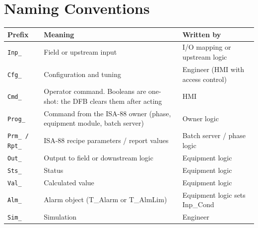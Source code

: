 \section{Naming Conventions}
\label{app:pclib:conv}
\begin{longtable}{@{}>{\raggedright\arraybackslash}p{2.4cm}>{\raggedright\arraybackslash}p{7.4cm}>{\raggedright\arraybackslash}p{4.6cm}@{}}
\toprule
\rowcolor{tblhead}\textbf{Prefix} & \textbf{Meaning} & \textbf{Written by} \\
\midrule
\endhead
\texttt{Inp\_} & Field or upstream input & I/\allowbreak{}O mapping or upstream logic \\
\texttt{Cfg\_} & Configuration and tuning & Engineer (HMI with access control) \\
\texttt{Cmd\_} & Operator command. Booleans are one-shot: the DFB clears them after acting & HMI \\
\texttt{Prog\_} & Command from the ISA-88 owner (phase, equipment module, batch server) & Owner logic \\
\texttt{Prm\_ /\allowbreak{} Rpt\_} & ISA-88 recipe parameters /\allowbreak{} report values & Batch server /\allowbreak{} phase logic \\
\texttt{Out\_} & Output to field or downstream logic & Equipment logic \\
\texttt{Sts\_} & Status & Equipment logic \\
\texttt{Val\_} & Calculated value & Equipment logic \\
\texttt{Alm\_} & Alarm object (T\_Alarm or T\_AlmLim) & Equipment logic sets Inp\_Cond \\
\texttt{Sim\_} & Simulation & Engineer \\
\bottomrule
\end{longtable}

